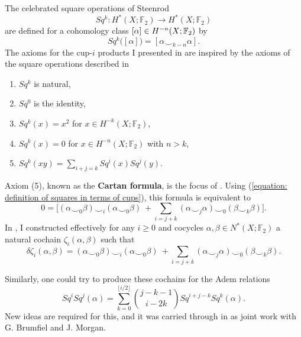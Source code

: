The celebrated square operations of Steenrod
\begin{equation*}
Sq^k : H^*(X; \mathbb F_2) \to H^*(X; \mathbb F_2)
\end{equation*}
are defined for a cohomology class $[\alpha] \in H^{-n}(X;{\mathbb{F}_2})$ by
\begin{equation} \label{equation: definition of squares in terms of cups}
Sq^k\big([\alpha]\big) = [\alpha \smallsmile_{k-n} \alpha].
\end{equation}
The axioms for the cup-$i$ products I presented in \cite{medina2018axiomatic} are inspired by the axioms of the square operations described in \cite{steenrod1962cohomology}
\begin{enumerate}
	\item $Sq^k$ is natural,
	\item $Sq^0$ is the identity,
	\item $Sq^k(x) = x^2$ for $x \in H^{-k}(X; \mathbb F_2)$,
	\item $Sq^k(x) = 0$ for $x \in H^{-n}(X; \mathbb F_2)$ with $n>k$,
	\item $Sq^k(xy) = \sum_{i+j=k} Sq^i (x) Sq^j(y)$.
\end{enumerate}
Axiom (5), known as the \textbf{Cartan formula}, is the focus of \cite{medina2020cartan}.
Using (\ref{equation: definition of squares in terms of cups}), this formula is equivalent to
\begin{equation*}
0 =
\Big[ (\alpha \smallsmile_0 \beta) \smallsmile_i (\alpha \smallsmile_0 \beta)\ +
\sum_{i=j+k} (\alpha \smallsmile_j \alpha) \smallsmile_0 (\beta \smallsmile_k \beta) \Big].
\end{equation*}
In \cite{medina2020cartan}, I constructed effectively for any $i \geq 0$ and cocycles $\alpha, \beta \in N^*(X; \mathbb F_2)$ a natural cochain $\zeta_i(\alpha, \beta)$ such that
\begin{equation*}
\delta \zeta_i(\alpha, \beta) =
(\alpha \smallsmile_0 \beta) \smallsmile_i (\alpha \smallsmile_0 \beta)\ + \sum_{i=j+k} (\alpha \smallsmile_j \alpha) \smallsmile_0 (\beta \smallsmile_k \beta).
\end{equation*}

Similarly, one could try to produce these cochains for the Adem relations
\begin{equation*}
Sq^i Sq^j(\alpha) = \sum_{k=0}^{\lfloor i/2 \rfloor} {j-k-1 \choose i-2k} Sq^{i+j-k} Sq^k(\alpha).
\end{equation*}
New ideas are required for this, and it was carried through in \cite{medina2021adem} as joint work with G. Brumfiel and J. Morgan.

